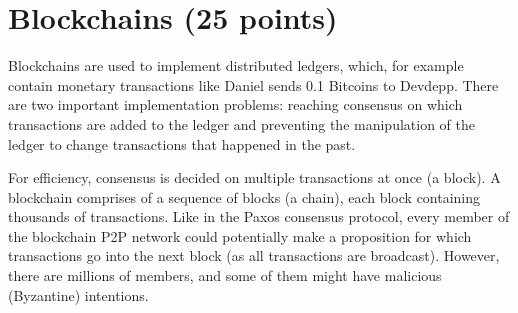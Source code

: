\documentclass{article}
\begin{document}
\section{Blockchains (25 points)}

Blockchains are used to implement distributed ledgers, which, for example contain monetary transactions like Daniel sends 0.1 Bitcoins to Devdepp. There are two important implementation problems: reaching consensus on which transactions are added to the ledger and preventing the manipulation of the ledger to change transactions that happened in the past.

For efficiency, consensus is decided on multiple transactions at once (a block). A blockchain comprises of a sequence of blocks (a chain), each block containing thousands of transactions. 
Like in the Paxos consensus protocol, every member of the blockchain P2P network could potentially make a proposition for which transactions go into the next block (as all transactions are broadcast). However, there are millions of members, and some of them might have malicious (Byzantine) intentions.
\end{document}
